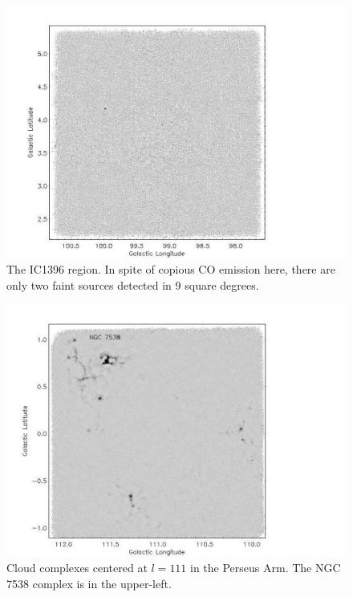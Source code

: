 \documentclass[12pt,preprint]{aastex}
\newcommand{\lon}{\ensuremath{l}}
\begin{document}
\begin{figure}
\begin{center}
  \includegraphics[scale=1.0]{f19e} \caption{The IC1396 region.  In
  spite of copious CO emission here, there are only two faint sources
  detected in 9 square degrees.}
\end{center}
\end{figure}

\addtocounter{figure}{-1}
\addtocounter{subfig}{1}

\begin{figure}
\begin{center}
  \includegraphics[scale=1.0]{f19f}
  \caption{Cloud complexes centered at $\lon=111$ in the Perseus Arm. 
  The NGC 7538 complex is in the upper-left.}
\end{center}
\end{figure}
\end{document}
